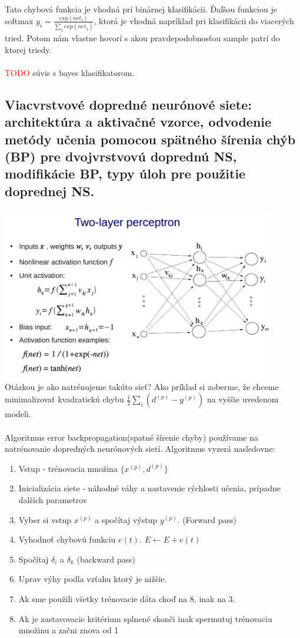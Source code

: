 \documentclass{article}
\numberwithin{equation}{section} %
\begin{document}
Tato chybová funkcia je vhodná pri binárnej klasifikácii. Ďaľšou funkciou je softmax $y_i = \frac{exp(net_i)}{\sum_j exp(net_j)}$, ktorá je vhodná napríklad pri klasifikácii do viacerých tried. Potom nám vlastne hovorí s akou pravdepodobnosťou sample patrí do ktorej triedy.
\\\\ \textcolor{red}{TODO} súvis s bayes klasifikatorom.

\subsection{Viacvrstvové dopredné neurónové siete: architektúra a aktivačné vzorce, odvodenie metódy učenia pomocou spätného šírenia chýb (BP) pre dvojvrstvovú doprednú NS, modifikácie BP, typy úloh pre použitie doprednej NS.}
\includegraphics[width=12cm]{imgs/2Lmlp}\\
Otázkou je ako natrénujeme takúto sieť? Ako príklad si zoberme, že chceme minimalizovať kvadratickú chybu $\frac{1}{2}\sum_i(d^{(p)} - y^{(p)})$ na vyššie uvedenom modeli. 
\\\\
Algoritmus error backpropagation(spatné šírenie chyby) používame na natrénovanie dopredných neurónových sietí. Algoritmus vyzerá nasledovne:\\
\begin{enumerate}
\item Vstup - trénovacia množina $\{x^{(p)}, d^{(p)}\}$
\item Inicializácia siete - náhodné váhy a nastavenie rýchlosti učenia, prípadne dalších parametrov
\item Vyber si vstup $x^{(p)}$ a spočítaj výstup $y^{(p)}$. (Forward pass)
\item Vyhodnoť chybovú funkciu $e(t)$.  $E \leftarrow E + e(t)$
\item Spočítaj $\delta_i$ a $\delta_k$ (backward pass)
\item Uprav výhy podla vzťahu ktorý je nižšie.
\item Ak sme použili všetky trénovacie dáta choď na 8. inak na 3.
\item Ak je zastavovacie kritérium splnené	skonči inak spermutuj trénovaciu množinu a začni znova od 1
\end{enumerate}
\end{document}
